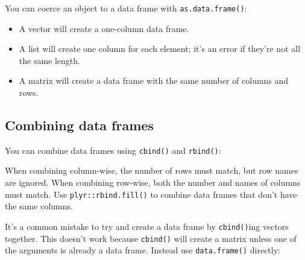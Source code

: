 You can coerce an object to a data frame with \texttt{as.data.frame()}:

\begin{itemize}
\item
  A vector will create a one-column data frame.
\item
  A list will create one column for each element; it's an error if
  they're not all the same length.
\item
  A matrix will create a data frame with the same number of columns and
  rows.
\end{itemize}

\subsection{Combining data frames}

You can combine data frames using \texttt{cbind()} and \texttt{rbind()}:
 

\begin{Shaded}
\begin{Highlighting}[]
\NormalTok{(} \NormalTok{:}\NormalTok{))}
\NormalTok{(} \NormalTok{, } \NormalTok{))}
\end{Highlighting}
\end{Shaded}

When combining column-wise, the number of rows must match, but row names
are ignored. When combining row-wise, both the number and names of
columns must match. Use \texttt{plyr::rbind.fill()} to combine data
frames that don't have the same columns.

It's a common mistake to try and create a data frame by
\texttt{cbind()}ing vectors together. This doesn't work because
\texttt{cbind()} will create a matrix unless one of the arguments is
already a data frame. Instead use \texttt{data.frame()} directly:

